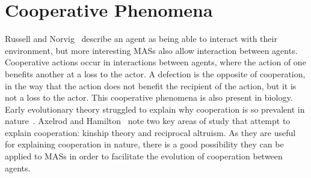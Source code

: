 \documentclass[]{final_report}
\begin{document}
\section{Cooperative Phenomena}
Russell and Norvig~\cite{russell2016artificial} describe an agent as being able to interact with their environment, but more interesting MASs also allow interaction between agents. Cooperative actions occur in interactions between agents, where the action of one benefits another at a loss to the actor. A defection is the opposite of cooperation, in the way that the action does not benefit the recipient of the action, but it is not a loss to the actor. This cooperative phenomena is also present in biology.\\
Early evolutionary theory struggled to explain why cooperation is so prevalent in nature~\cite{spencer1864principles}. Axelrod and Hamilton~\cite{evolution_of_cooperation} note two key areas of study that attempt to explain cooperation: kinship theory and reciprocal altruism. As they are useful for explaining cooperation in nature, there is a good possibility they can be applied to MASs in order to facilitate the evolution of cooperation between agents.
\end{document}
